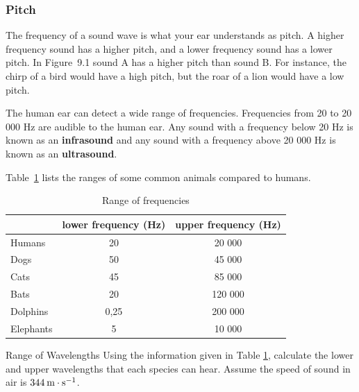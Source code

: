             \subsubsection{Pitch}
            \nopagebreak
            \label{m38799*id183534}The frequency of a sound wave is what your ear understands as pitch. A higher frequency sound has a higher pitch, and a lower frequency sound has a lower pitch. In Figure~9.1 sound A has a higher pitch than sound B. For instance, the chirp of a bird would have a high pitch, but the roar of a lion would have a low pitch.\par 
        \label{m38799*id183546}The human ear can detect a wide range of frequencies. Frequencies from 20 to 20 000 Hz are audible to the human ear. Any sound with a frequency below 20 Hz is known as an \textbf{infrasound} and any sound with a frequency above 20 000 Hz is known as an \textbf{ultrasound}. \par 
 Table~\ref{p:wsl:s11:rangeoff} lists the ranges of some common animals compared to humans.

\begin{table}[htbp]
\begin{center}
\caption{Range of frequencies}
\label{p:wsl:s11:rangeoff}
\begin{tabular}{|l|c|c|}\hline
&lower frequency (Hz) & upper frequency (Hz)\\\hline\hline
Humans & 20 & 20 000\\\hline
Dogs & 50 & 45 000\\\hline
Cats & 45 & 85 000\\\hline
Bats & 20 & 120 000\\\hline
Dolphins & 0,25 & 200 000\\\hline
Elephants & 5 & 10 000\\\hline
\hline
\end{tabular}
\end{center}
\end{table}
    \par
\begin{activity}{Range of Wavelengths }
            \nopagebreak
        \label{m38799*id183776}Using the information given in Table \ref{p:wsl:s11:rangeoff}, calculate the lower and upper wavelengths that each species can hear. Assume the speed of sound in air is $344\phantom{\rule{2pt}{0ex}}\text{m}\ensuremath{\cdot}\text{s}{}^{-1}$.
\end{activity}
 
      \label{m38799*uid4}
